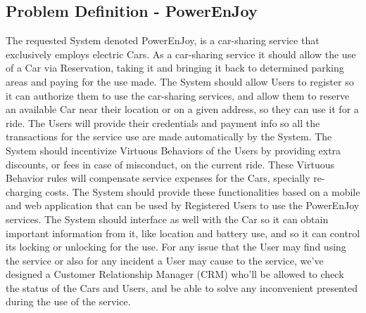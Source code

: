 \documentclass[a4paper]{article}
\begin{document}
\subsection{Problem Definition - PowerEnJoy}
The requested System denoted PowerEnJoy, is a car-sharing service that  exclusively employs electric Cars. 
\newline\newline
As a car-sharing service it should allow the use of a Car via Reservation, taking it and bringing it back to determined parking areas and paying for the use made.
\newline\newline
The System should allow Users to register so it can authorize them to use the car-sharing services, and allow them to reserve an available Car near their location or on a given address, so they can use it for a ride. 
\newline\newline
The Users will provide their credentials and payment info so all the transactions for the service use are made automatically by the System.
\newline\newline
The System should incentivize Virtuous Behaviors of the Users by providing extra discounts, or fees in case of misconduct, on the current ride. These Virtuous Behavior rules will compensate service expenses for the Cars, specially re-charging costs.
\newline\newline
The System should provide these functionalities based on a mobile and web application that can be used by Registered Users to use the PowerEnJoy services. The System should interface as well with the Car so it can obtain important information from it, like location and battery use, and so it can control its locking or unlocking for the use.
\newline\newline
For any issue that the User may find using the service or also for any incident a User may cause to the service, we've designed a Customer Relationship Manager (CRM) who'll be allowed to check the status of the Cars and Users, and be able to solve any inconvenient presented during the use of the service. 
\end{document}
